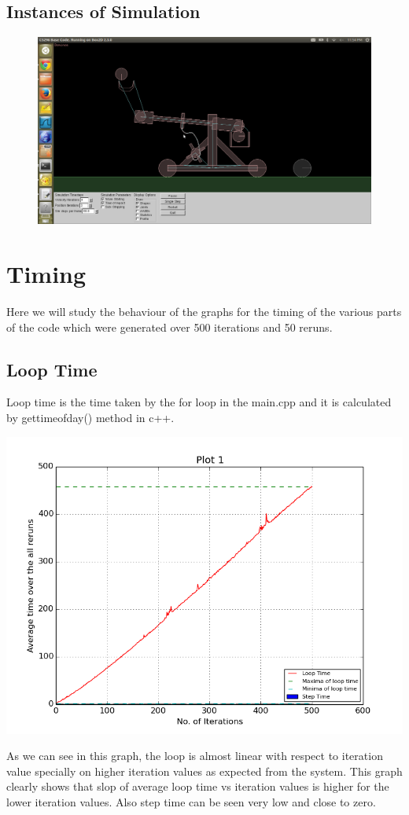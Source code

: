 \documentclass[11pt]{article}
\begin{document}
\subsection{Instances of Simulation}
\begin{figure}[!ht]
\centering
\includegraphics[scale=0.5]{image1}
\end{figure}

\section{Timing}
Here we will study the behaviour of the graphs for the timing of the various parts of the code which were generated over 500 iterations and 50 reruns.
\subsection{Loop Time}
Loop time is the time taken by the for loop in the main.cpp and it is calculated by gettimeofday() method in c++.
\begin{center}
\includegraphics[scale=0.5]{g12_plot01}
\end{center}
As we can see in this graph, the loop is almost linear with respect to iteration value specially on higher iteration values as expected from the system. This graph clearly shows that slop of average loop time vs iteration values is higher for the lower iteration values.
Also step time can be seen very low and close to zero.
\end{document}
